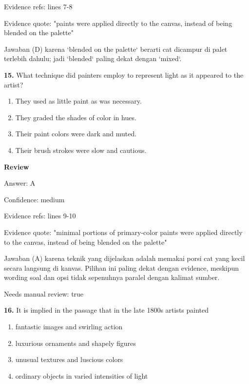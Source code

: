 \documentclass[12pt]{article}
\begin{document}
Evidence refs: lines 7-8\par
Evidence quote: "paints were applied directly to the canvas, instead of being blended on the palette"\par
Jawaban (D) karena `blended on the palette` berarti cat dicampur di palet terlebih dahulu; jadi `blended` paling dekat dengan `mixed`.\par
\endgroup
\par
\vspace{0.25\baselineskip}
\noindent\textbf{15.} What technique did painters employ to represent light as it appeared to the artist?
\begin{enumerate}[label=(\Alph*),leftmargin=*,itemsep=0.2em]
\item They used as little paint as was necessary.
\item They graded the shades of color in hues.
\item Their paint colors were dark and muted.
\item Their brush strokes were slow and cautious.
\end{enumerate}
\par
\begingroup
\setlength{\parskip}{0pt}
\setlength{\parindent}{0pt}
\textbf{Review}\par
Answer: A\par
Confidence: medium\par
Evidence refs: lines 9-10\par
Evidence quote: "minimal portions of primary-color paints were applied directly to the canvas, instead of being blended on the palette"\par
Jawaban (A) karena teknik yang dijelaskan adalah memakai porsi cat yang kecil secara langsung di kanvas. Pilihan ini paling dekat dengan evidence, meskipun wording soal dan opsi tidak sepenuhnya paralel dengan kalimat sumber.\par
Needs manual review: true\par
\endgroup
\par
\vspace{0.25\baselineskip}
\noindent\textbf{16.} It is implied in the passage that in the late 1800s artists painted
\begin{enumerate}[label=(\Alph*),leftmargin=*,itemsep=0.2em]
\item fantastic images and swirling action
\item luxurious ornaments and shapely figures
\item unusual textures and luscious colors
\item ordinary objects in varied intensities of light
\end{enumerate}
\end{document}
